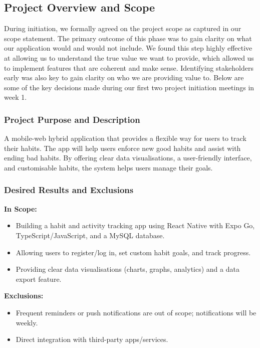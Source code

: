 \subsection{Project Overview and Scope}
During initiation, we formally agreed on the project scope as captured in our scope statement. The primary outcome of this phase was to gain clarity on what our application would and would not include. We found this step highly effective at allowing us to understand the true value we want to provide, which allowed us to implement features that are coherent and make sense. Identifying stakeholders early was also key to gain clarity on who we are providing value to. Below are some of the key decisions made during our first two project initiation meetings in week 1.

\subsubsection{Project Purpose and Description}
A mobile-web hybrid application that provides a flexible way for users to track their habits. The app will help users enforce new good habits and assist with ending bad habits. By offering clear data visualisations, a user-friendly interface, and customisable habits, the system helps users manage their goals.

\subsubsection{Desired Results and Exclusions}
\textbf{In Scope:}
\begin{itemize}
    \item Building a habit and activity tracking app using React Native with Expo Go, TypeScript/JavaScript, and a MySQL database.
    \item Allowing users to register/log in, set custom habit goals, and track progress.
    \item Providing clear data visualisations (charts, graphs, analytics) and a data export feature.
\end{itemize}

\textbf{Exclusions:}
\begin{itemize}
    \item Frequent reminders or push notifications are out of scope; notifications will be weekly.
    \item Direct integration with third-party apps/services.
\end{itemize}

